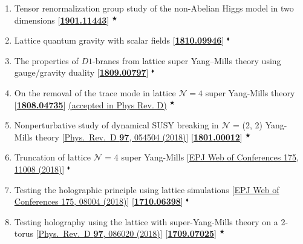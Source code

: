  \begin{enumerate}
  \item Tensor renormalization group study of the non-Abelian Higgs model in two dimensions [\textbf{\textcolor{blue}{\href{https://arxiv.org/abs/1901.11443}{1901.11443}}}]  $^{\bigstar}$
 \item  Lattice quantum gravity with scalar fields [\textbf{\textcolor{blue}{\href{https://arxiv.org/abs/1810.09946}{1810.09946}}}] $^{\blacklozenge}$
  \item  The properties of $D1$-branes from lattice super Yang--Mills theory using gauge/gravity duality   [\textbf{\textcolor{blue}{\href{https://arxiv.org/abs/1809.00797}{1809.00797}}}] $^{\blacklozenge}$
  \item On the removal of the trace mode in lattice $\mathcal{N }= 4$ super Yang-Mills theory  [\textbf{\textcolor{blue}{\href{https://arxiv.org/abs/1808.04735}{1808.04735}}}] \href{https://journals.aps.org/prd/accepted/8d072Q69Ide18d24f2c61259a36a4536c02c700b5}{(accepted in Phys Rev. D)} $^{\bigstar}$
 \item Nonperturbative study of dynamical SUSY breaking in $\mathcal{N}$ = (2, 2) Yang-Mills theory  [\href{https://journals.aps.org/prd/abstract/10.1103/PhysRevD.97.054504}{Phys.\ Rev.\ D {\bf 97}, 054504 (2018)}] [\textbf{\textcolor{blue}{\href{https://arxiv.org/abs/1801.00012}{1801.00012}}}]   $^{\bigstar}$
 \item Truncation of lattice $\mathcal{N}$ = 4 super Yang-Mills [\href{https://doi.org/10.1051/epjconf/201817511008}{EPJ Web of Conferences 175, 11008 (2018)}] $^{\blacklozenge}$
\item Testing the holographic principle using lattice simulations  [\href{https://doi.org/10.1051/epjconf/201817508004}{EPJ Web of Conferences 175, 08004 (2018)}] [\textbf{\textcolor{blue}{\href{https://arxiv.org/abs/1710.06398}{1710.06398}}}] $^{\blacklozenge}$
\item Testing holography using the lattice with super-Yang-Mills theory on a 2-torus [\href{https://journals.aps.org/prd/abstract/10.1103/PhysRevD.97.086020}{Phys.\ Rev.\ D {\bf 97}, 086020 (2018)}] [\textbf{\textcolor{blue}{\href{https://arxiv.org/abs/1709.07025}{1709.07025}}}] $^{\bigstar}$

\end{enumerate}


